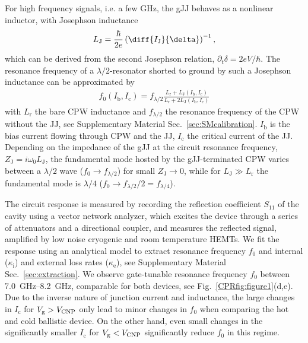 For high frequency signals, i.e. a few \si{\giga\hertz}, the gJJ behaves as a nonlinear inductor, with Josephson inductance
%
\begin{align}
L_\text{J} = \frac{\hbar}{2e}\left(\diff{I_\text{J}}{\delta}\right)^{-1},
\label{CPReq:LJgeneral}
\end{align}
%
which can be derived from the second Josephson relation, $\partial_t\delta=2e V/\hbar$.
%
The resonance frequency of a $\lambda/2$-resonator shorted to ground by such a Josephson inductance can be approximated by
\begin{align}
f_0\left(I_\text{b},I_\text{c}\right) = f_{\lambda/2} \frac{L_\text{r}+L_\text{J}\left(I_\text{b}, I_\text{c}\right)}{L_\text{r} +  2L_\text{J}\left(I_\text{b}, I_\text{c}\right)}
\label{CPReq:Pogorzalek}
\end{align}
%
with $L_\text{r}$ the bare CPW inductance and $f_{\lambda/2}$ the resonance frequency of the CPW without the JJ, see Supplementary Material Sec.~\ref{sec:SMcalibration}.
%
$I_\text{b}$ is the bias current flowing through CPW and the JJ, $I_\text{c}$ the critical current of the JJ.
%
Depending on the impedance of the gJJ at the circuit resonance frequency, $Z_\text{J}=i\omega_0 L_\text{J}$, the fundamental mode hosted by the gJJ-terminated CPW varies between a $\lambda/2$ wave ($f_0\rightarrow f_{\lambda/2}$) for small $Z_\text{J}\rightarrow0$, while for $L_\text{J}\gg L_\text{r}$ the fundamental mode is $\lambda/4$ ($f_0 \rightarrow f_{\lambda/2}/2=f_{\lambda/4}$).

The circuit response is measured by recording the reflection coefficient $S_{11}$ of the cavity using a vector network analyzer, which excites the device through a series of attenuators and a directional coupler, and measures the reflected signal, amplified by low noise cryogenic and room temperature HEMTs. 
%
We fit the response using an analytical model to extract resonance frequency $f_0$ and internal ($\kappa_\text{i}$) and external loss rates ($\kappa_\text{e}$), see Supplementary Material Sec.~\ref{sec:extraction}.
%
We observe gate-tunable resonance frequency $f_0$ between \SIrange{7.0}{8.2}{\giga\hertz}, comparable for both devices, see Fig.~\ref{CPRfig:figure1}(d,e).
%
Due to the inverse nature of junction current and inductance, the large changes in $I_\text{c}$ for $V_\text{g}>V_{\rm CNP}$ only lead to minor changes in $f_0$ when comparing the hot and cold ballistic device.
%
On the other hand, even small changes in the significantly smaller $I_\text{c}$ for $V_\text{g}<V_{\rm CNP}$ significantly reduce $f_0$ in this regime.

